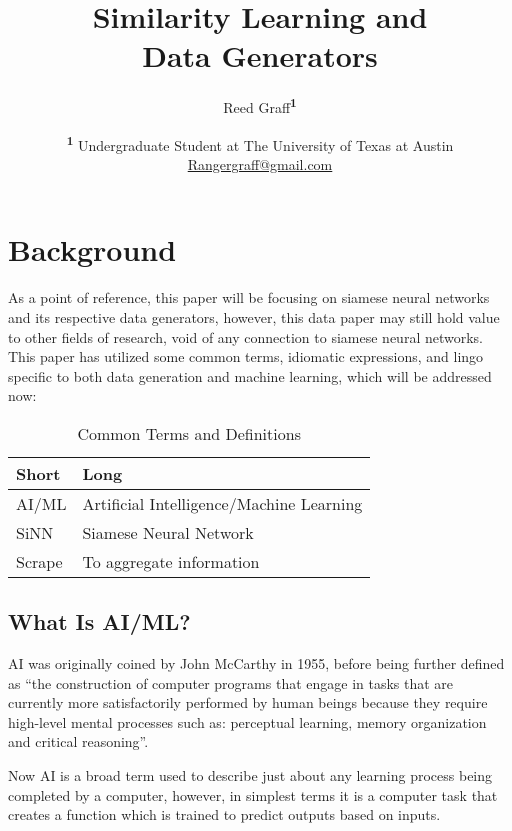 \documentclass[
	letterpaper, %
	10pt, %
	unnumberedsections, %
	twoside, %
]{LTJournalArticle}
\title{Similarity Learning and\\ Data Generators} %
\author{%
	Reed Graff\textsuperscript{\textbf{1}}
}
\date{\footnotesize\textsuperscript{\textbf{1}} Undergraduate Student at The University of Texas at Austin \\ \href{mailto:Rangergraff@gmail.com}{Rangergraff@gmail.com}}
\begin{document}
\maketitle %


\section{Background}

As a point of reference, this paper will be focusing on siamese neural networks and its respective data generators, however, this data paper may still hold value to other fields of research, void of any connection to siamese neural networks. This paper has utilized some common terms, idiomatic expressions, and lingo specific to both data generation and machine learning, which will be addressed now:

\begin{table}[hbt!] %
	\caption{Common Terms and Definitions}
	\centering
	\begin{tabular}{l l}
		\toprule
		Short & Long \\
		\midrule
        AI/ML & Artificial Intelligence/Machine Learning \\
        SiNN & Siamese Neural Network \\
        Scrape & To aggregate information \\
		\bottomrule
	\end{tabular}
	\label{tab:terms}
\end{table}

\subsection{What Is AI/ML?}
AI was originally coined by John McCarthy in 1955, before being further defined as “the construction of computer programs that engage in tasks that are currently more satisfactorily performed by human beings because they require high-level mental processes such as: perceptual learning, memory organization and critical reasoning”\autocite{forbes_press, history_of_artificial_intelligence}.

Now AI is a broad term used to describe just about any learning process being completed by a  computer, however, in simplest terms it is a computer task that creates a function which is trained to predict outputs based on inputs.
\end{document}
